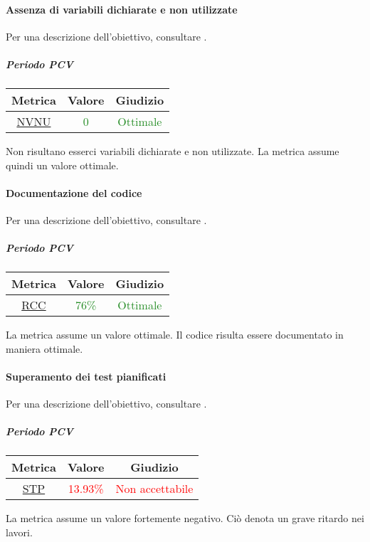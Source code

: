 			\newpage
			\paragraph{Assenza di variabili dichiarate e non utilizzate}
			Per una descrizione dell'obiettivo, consultare .
				\subparagraph{Periodo PCV}
			
			\begin{table}[H]
				\centering
				\begin{tabular}{  c | c | c}
					\hline
					\textbf{Metrica} & \textbf{Valore} & \textbf{Giudizio} \\
					\hline
					\hyperref[MMC]{NVNU}   & \textcolor{ForestGreen}{0}          & \textcolor{ForestGreen}{Ottimale}  \\ \hline
				\end{tabular} 
			\end{table}
		
			Non risultano esserci variabili dichiarate e non utilizzate. La metrica assume quindi un valore ottimale.
		
			\newpage
			\paragraph{Documentazione del codice}
			Per una descrizione dell'obiettivo, consultare .
				\subparagraph{Periodo PCV}
				
				\begin{table}[H]
					\centering
					\begin{tabular}{  c | c | c}
						\hline
						\textbf{Metrica} & \textbf{Valore} & \textbf{Giudizio} \\
						\hline
						\hyperref[MMC]{RCC}   & \textcolor{ForestGreen}{76\%}          & \textcolor{ForestGreen}{Ottimale}  \\ \hline
					\end{tabular} 
				\end{table}	
			La metrica assume un valore ottimale. Il codice risulta essere documentato in maniera ottimale.
			
			\newpage
			\paragraph{Superamento dei test pianificati}
			Per una descrizione dell'obiettivo, consultare .
				\subparagraph{Periodo PCV}
				
				\begin{table}[H]
					\centering
					\begin{tabular}{  c | c | c}
						\hline
						\textbf{Metrica} & \textbf{Valore} & \textbf{Giudizio} \\
						\hline
						\hyperref[MMC]{STP}   & \textcolor{Red}{13.93\%}          & \textcolor{Red}{Non accettabile}  \\ \hline
					\end{tabular} 
				\end{table}
				La metrica assume un valore fortemente negativo. Ciò denota un grave ritardo nei lavori.
				
